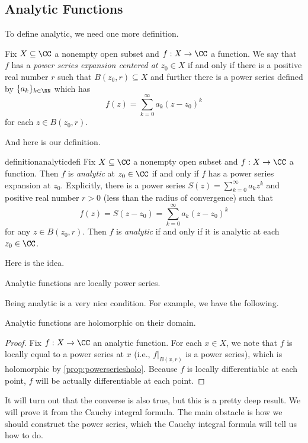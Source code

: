 \subsection{Analytic Functions}
To define analytic, we need one more definition.
\begin{definition}
	Fix $X\subseteq\CC$ a nonempty open subset and $f:X\to\CC$ a function. We say that $f$ has a \textit{power series expansion centered at $z_0\in X$}
	if and only if there is a positive real number $r$ such that $B(z_0,r)\subseteq X$ and further there is a power series defined by
	$\{a_k\}_{k\in\NN}$ which has
	\[f(z)=\sum_{k=0}^\infty a_k(z-z_0)^k\]
	for each $z\in B(z_0,r)$.
\end{definition}
And here is our definition.
\begin{restatable}[Analytic]{definition}{analyticdefi}
	Fix $X\subseteq\CC$ a nonempty open subset and $f:X\to\CC$ a function. Then $f$ is \textit{analytic} at $z_0\in\CC$ if and only if $f$ has a power series expansion at $z_0$. Explicitly, there is a power series $S(z)=\sum_{k=0}^\infty a_kz^k$ and positive real number $r>0$ (less than the radius of convergence) such that
	\[f(z)=S(z-z_0)=\sum_{k=0}^\infty a_k(z-z_0)^k\]
	for any $z\in B(z_0,r)$. Then $f$ is \textit{analytic} if and only if it is analytic at each $z_0\in\CC$.
\end{restatable}
\noindent Here is the idea.
\begin{idea}
	Analytic functions are locally power series.
\end{idea}
Being analytic is a very nice condition. For example, we have the following.
\begin{proposition} \label{prop:anaisholo}
	Analytic functions are holomorphic on their domain.
\end{proposition}
\begin{proof}
	Fix $f:X\to\CC$ an analytic function. For each $x\in X$, we note that $f$ is locally equal to a power series at $x$ (i.e., $f|_{B(x,r)}$ is a power series), which is holomorphic by \autoref{prop:powerseriesholo}. Because $f$ is locally differentiable at each point, $f$ will be actually differentiable at each point.
\end{proof}
\begin{remark}
	It will turn out that the converse is also true, but this is a pretty deep result. We will prove it from the Cauchy integral formula. The main obstacle is how we should construct the power series, which the Cauchy integral formula will tell us how to do.
\end{remark}
